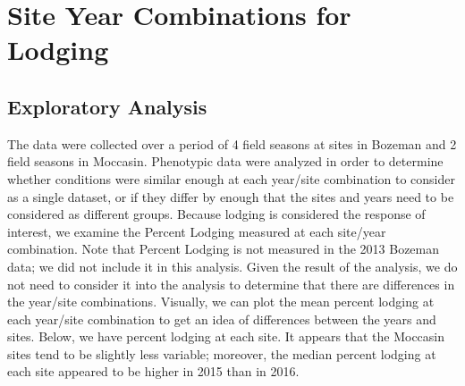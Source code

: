 \documentclass[11pt]{article}
\begin{document}
\begin{knitrout}
\begin{kframe}
{\ttfamily\noindent\bfseries{}}

{\ttfamily\noindent\bfseries{}}

{\ttfamily\noindent\bfseries\color{errorcolor}{Error in subset(moccasin15, select = -c(X)): object 'moccasin15' not found}}

{\ttfamily\noindent\bfseries\color{errorcolor}{Error in ncol(x): object 'moccasin15' not found}}

{\ttfamily\noindent\bfseries{}}

{\ttfamily\noindent\bfseries\color{errorcolor}{Error in ncol(x): object 'moccasin16' not found}}\end{kframe}
\end{knitrout}


\section{Site Year Combinations for Lodging}


\begin{knitrout}\footnotesize
{}\color{fgcolor}\begin{kframe}


{\ttfamily\noindent\bfseries{}}\end{kframe}
\end{knitrout}

\subsection{Exploratory Analysis} 
The data were collected over a period of 4 field seasons at sites in Bozeman and 2 field seasons in Moccasin. Phenotypic data were analyzed in order to determine whether conditions were similar enough at each year/site combination to consider as a single dataset, or if they differ by enough that the sites and years need to be considered as different groups.  
Because lodging is considered the response of interest, we examine the Percent Lodging measured at each site/year combination. Note that Percent Lodging is not measured in the 2013 Bozeman data; we did not include it in this analysis. Given the result of the analysis, we do not need to consider it into the analysis to determine that there are differences in the year/site combinations.  Visually, we can plot the mean percent lodging at each year/site combination to get an idea of differences between the years and sites. Below, we have percent lodging at each site. It appears that the Moccasin sites tend to be slightly less variable; moreover, the median percent lodging at each site appeared to be higher in 2015 than in 2016.
\end{document}
